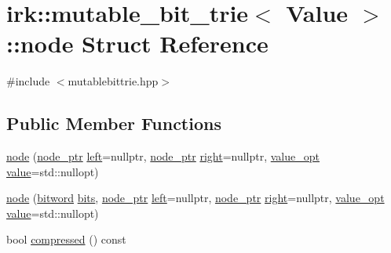 \hypertarget{structirk_1_1mutable__bit__trie_1_1node}{}\section{irk\+:\+:mutable\+\_\+bit\+\_\+trie$<$ Value $>$\+:\+:node Struct Reference}
\label{structirk_1_1mutable__bit__trie_1_1node}


{\ttfamily \#include $<$mutablebittrie.\+hpp$>$}

\subsection*{Public Member Functions}
\begin{DoxyCompactItemize}
\item 
\mbox{\hyperlink{structirk_1_1mutable__bit__trie_1_1node_a74037ab76023b8ff9c1cd88f91d06684}{node}} (\mbox{\hyperlink{classirk_1_1mutable__bit__trie_abd23179ac4f02a981d4f47b4c0652287}{node\+\_\+ptr}} \mbox{\hyperlink{structirk_1_1mutable__bit__trie_1_1node_af59565476fb0ce3e3e3d57edbd8ca1de}{left}}=nullptr, \mbox{\hyperlink{classirk_1_1mutable__bit__trie_abd23179ac4f02a981d4f47b4c0652287}{node\+\_\+ptr}} \mbox{\hyperlink{structirk_1_1mutable__bit__trie_1_1node_ad75512c087c6adaf342b9c62fd115f55}{right}}=nullptr, \mbox{\hyperlink{classirk_1_1mutable__bit__trie_a9a5ed79af3e7e28054b00c2284b35612}{value\+\_\+opt}} \mbox{\hyperlink{structirk_1_1mutable__bit__trie_1_1node_a1bacc998d6276431578e9ecb8f3dfa59}{value}}=std\+::nullopt)
\item 
\mbox{\hyperlink{structirk_1_1mutable__bit__trie_1_1node_a8b89d07cbc5be62f39eb3995659812b2}{node}} (\mbox{\hyperlink{namespaceirk_a979e09720c2ef05573819388a3c0e79a}{bitword}} \mbox{\hyperlink{structirk_1_1mutable__bit__trie_1_1node_a8b55d968fa4274a91a6395ea1b9785a8}{bits}}, \mbox{\hyperlink{classirk_1_1mutable__bit__trie_abd23179ac4f02a981d4f47b4c0652287}{node\+\_\+ptr}} \mbox{\hyperlink{structirk_1_1mutable__bit__trie_1_1node_af59565476fb0ce3e3e3d57edbd8ca1de}{left}}=nullptr, \mbox{\hyperlink{classirk_1_1mutable__bit__trie_abd23179ac4f02a981d4f47b4c0652287}{node\+\_\+ptr}} \mbox{\hyperlink{structirk_1_1mutable__bit__trie_1_1node_ad75512c087c6adaf342b9c62fd115f55}{right}}=nullptr, \mbox{\hyperlink{classirk_1_1mutable__bit__trie_a9a5ed79af3e7e28054b00c2284b35612}{value\+\_\+opt}} \mbox{\hyperlink{structirk_1_1mutable__bit__trie_1_1node_a1bacc998d6276431578e9ecb8f3dfa59}{value}}=std\+::nullopt)
\item 
bool \mbox{\hyperlink{structirk_1_1mutable__bit__trie_1_1node_a3b28e6bf24b4500b5b9fd7d3c1bb48e0}{compressed}} () const
\end{DoxyCompactItemize}
